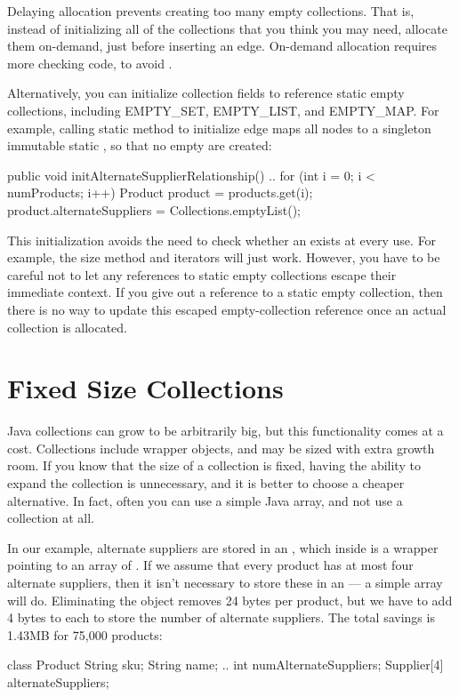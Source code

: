  Delaying allocation prevents creating too many empty collections.
 That is, instead of initializing all of the collections that you think you
 may need, allocate them on-demand, just before inserting an edge. On-demand
 allocation requires more checking code, to avoid .
 
 Alternatively, you can initialize collection fields to reference static empty collections,
 including EMPTY\_SET,
 EMPTY\_LIST, and EMPTY\_MAP. For example, 
 calling static method  to initialize edge
  maps all nodes to a singleton immutable static
 , so that no empty  are created:
 \begin{shortlisting}
     public void initAlternateSupplierRelationship() {
       ..
       for (int i = 0; i < numProducts; i++) {
          Product product = products.get(i);
          product.alternateSuppliers = 
                               Collections.emptyList();
       }
     } 
 \end{shortlisting}
This initialization avoids the need to check whether an 
exists at every use. For example, the size method and iterators will just work.
However, you have to be careful not to let any references to static empty
collections escape their immediate context. 
If you give out a reference to a static empty collection, 
then there is no way to update this escaped empty-collection reference
once an actual collection is allocated. 

\section{Fixed Size Collections}

Java collections can grow to be
arbitrarily big, but this functionality comes at a cost.
Collections include wrapper objects, and 
may be sized with extra growth room. If
you know that the size of a collection is fixed, having the ability to expand
the collection is unnecessary, and it is better to choose a cheaper alternative.
In fact, often you can use a
simple Java array, and not use a collection at all.  

In our example, alternate suppliers are stored in an
 , which inside is a
wrapper pointing to an array of .  If we assume that
every product has at most four alternate suppliers, then  it isn't 
necessary to store these in an  --- a simple array will do.
Eliminating the  object removes 24 bytes per
product, but we have to add 4 bytes to each  to store the number
of alternate suppliers. The total savings is 1.43MB for 75,000 products:
\begin{shortlisting} 
class Product {
	String sku;
	String name;
	.. 
	int numAlternateSuppliers;
	Supplier[4] alternateSuppliers;
}
\end{shortlisting}
 

